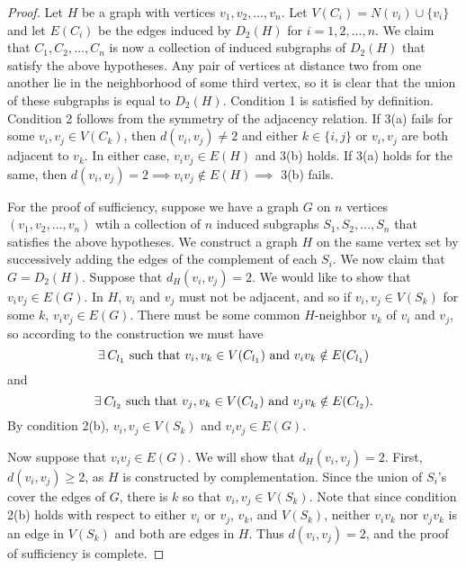 \begin{proof}
Let $H$ be a graph with vertices $v_1, v_2, \ldots, v_n$.  Let $V(C_i) = N(v_i) \cup \{v_i\}$ and let $E(C_i)$ be the edges induced by $D_2(H)$ for $i = 1,2,\ldots, n$.  We claim that $C_1, C_2, \ldots, C_n$ is now a collection of induced subgraphs of $D_2(H)$ that satisfy the above hypotheses.  Any pair of vertices at distance two from one another lie in the neighborhood of some third vertex, so it is clear that the union of these subgraphs is equal to $D_2(H)$.  Condition 1 is satisfied by definition.  Condition 2 follows from the symmetry of the adjacency relation.  If 3(a) fails for some $v_i, v_j \in V(C_k)$, then $d(v_i, v_j) \neq 2$ and either $k \in \{i,j\}$ or $v_i, v_j$ are both adjacent to $v_k$.  In either case, $v_iv_j \in E(H)$ and 3(b) holds.  If 3(a) holds for the same, then $d(v_i, v_j) = 2 \implies v_iv_j \notin E(H) \implies$ 3(b) fails.

For the proof of sufficiency, suppose we have a graph $G$ on $n$ vertices $(v_1, v_2, \ldots, v_n)$ wtih a collection of $n$ induced subgraphs $S_1, S_2, \ldots, S_n$ that satisfies the above hypotheses.  We construct a graph $H$ on the same vertex set by successively adding the edges of the complement of each $S_i$.  We now claim that $G = D_2(H)$.  Suppose that $d_H(v_i, v_j) = 2$.  We would like to show that $v_iv_j\in E(G)$.  In $H$, $v_i$ and $v_j$ must not be adjacent, and so if $v_i, v_j \in V(S_k)$ for some $k$, $v_iv_j \in E(G)$.  There must be some common $H$-neighbor $v_k$ of $v_i$ and $v_j$, so according to the construction we must have
\[\exists\: C_{l_1} \makebox{ such that } v_i, v_k \in V(C_{l_1}) \makebox{ and } v_iv_k\notin E(C_{l_1})\] and
\[\exists\: C_{l_2} \makebox{ such that } v_j, v_k \in V(C_{l_2}) \makebox{ and } v_jv_k\notin E(C_{l_2}).\]  By condition 2(b), $v_i, v_j \in V(S_k)$ and $v_iv_j \in E(G)$.

Now suppose that $v_iv_j \in E(G)$.  We will show that $d_H(v_i, v_j) = 2$.  First, $d(v_i,v_j) \geq 2$, as $H$ is constructed by complementation.  Since the union of $S_i$'s cover the edges of $G$, there is $k$ so that $v_i, v_j \in V(S_k)$.  Note that since condition 2(b) holds with respect to either $v_i$ or $v_j$, $v_k$, and $V(S_k)$, neither $v_iv_k$ nor $v_jv_k$ is an edge in $V(S_k)$ and both are edges in $H$.  Thus $d(v_i, v_j) = 2$, and the proof of sufficiency is complete.
\end{proof}

	
